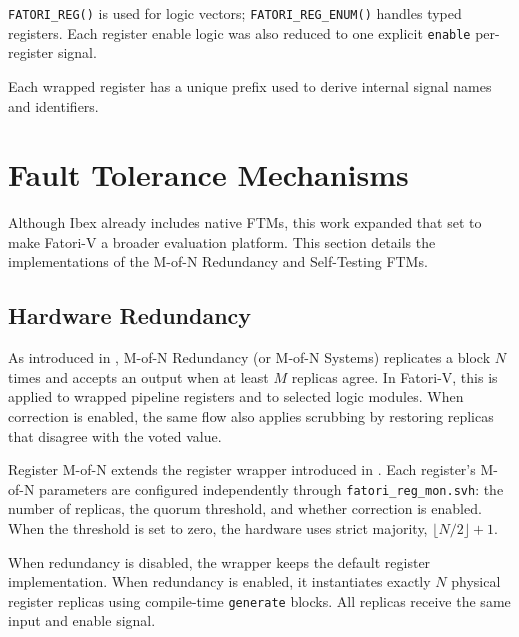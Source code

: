 \texttt{FATORI\_REG()} is used for logic vectors; \texttt{FATORI\_REG\_ENUM()} handles typed registers. Each register enable logic was also reduced to one explicit \texttt{enable} per-register signal.

Each wrapped register has a unique prefix used to derive internal signal names and identifiers.






\section{Fault Tolerance Mechanisms}
\label{chap6:ftms}

Although Ibex already includes native \acp{FTM}, this work expanded that set to make \ac{Fatori-V} a broader evaluation platform. This section details the implementations of the M-of-N Redundancy and Self-Testing \acp{FTM}. 



\subsection{Hardware Redundancy}
\label{chap6:mon}

As introduced in , M-of-N Redundancy (or M-of-N Systems) replicates a block \(N\) times and accepts an output when at least \(M\) replicas agree. In \ac{Fatori-V}, this is applied to wrapped pipeline registers and to selected logic modules. When correction is enabled, the same flow also applies scrubbing by restoring replicas that disagree with the voted value.

\label{chap6:mofn_reg}Register M-of-N extends the register wrapper introduced in . Each register's M-of-N parameters are configured independently through \texttt{fatori\_reg\_mon.svh}: the number of replicas, the quorum threshold, and whether correction is enabled. When the threshold is set to zero, the hardware uses strict majority, \(\lfloor N/2 \rfloor + 1\).

When redundancy is disabled, the wrapper keeps the default register implementation. When redundancy is enabled, it instantiates exactly \(N\) physical register replicas using compile-time \texttt{generate} blocks. All replicas receive the same input and enable signal.

